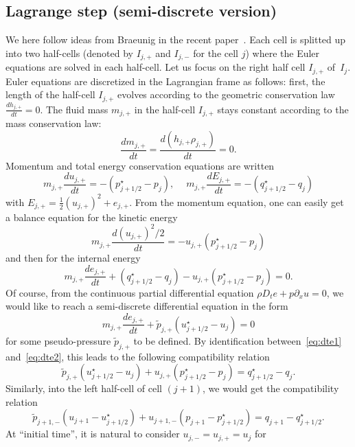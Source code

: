 \documentclass[graybox]{svmult}
\newcommand{\rhojp}{\rho_{j,+}}
\newcommand{\ujp}{u_{j,+}}
\newcommand{\pjp}{\tilde p_{j,+}}
\newcommand{\ps}{p_{j+1/2}^\star}
\newcommand{\us}{u_{j+1/2}^\star}
\newcommand{\qs}{q_{j+1/2}^\star}
\newcommand{\ejp}{e_{j,+}}
\newcommand{\Ejp}{E_{j,+}}
\newcommand{\mjp}{m_{j,+}}
\newcommand{\hjp}{h_{j,+}}
\begin{document}
\subsection{Lagrange step (semi-discrete version)}
%
We here follow ideas from Braeunig in the recent paper~\cite{JPB2016}. Each cell is splitted
up into two half-cells (denoted by $I_{j,+}$ and $I_{j,-}$ for the cell $j$) where the Euler equations are solved in each half-cell. Let us focus on the right half cell $I_{j,+}$
of~$I_j$.
Euler equations are discretized in the Lagrangian frame as follows: first,
the length of the half-cell $I_{j,+}$ evolves according to the geometric conservation law
$\frac{d\hjp}{dt} = 0$. The fluid mass $\mjp$ in the half-cell $I_{j,+}$ stays constant according to the mass conservation law: 
\[
\frac{d\mjp}{dt} = \frac{d(\hjp\rhojp)}{dt} = 0.
\]
Momentum and total energy conservation equations are written
%
\[
\mjp \frac{d\ujp}{dt} = -\left(\ps - p_j\right), \ \quad \mjp \frac{d\Ejp}{dt} = -\left(\qs - q_j\right)
\]
%
with $\Ejp = \frac{1}{2}(\ujp)^2+\ejp$. From the momentum equation, one can easily
get a balance equation for the kinetic energy
\[
\mjp \frac{d(\ujp)^2/2}{dt} = -\ujp\left(\ps - p_j\right)
\]
and then for the internal energy
%
\begin{equation}
\mjp \frac{d\ejp}{dt} + \left(\qs - q_j\right) - \ujp\left(\ps - p_j\right) = 0.
\label{eq:dte1}
\end{equation}
%
Of course, from the continuous partial differential equation $\rho D_t e + p \partial_x u = 0$, we would like
to reach a semi-discrete differential equation in the form
%
\begin{equation}
\mjp \frac{d\ejp}{dt} + \pjp \left(\us - u_j \right) = 0
\label{eq:dte2}
\end{equation}
%
for some pseudo-pressure $\pjp$ to be defined.
%
By identification between~\eqref{eq:dte1} and~\eqref{eq:dte2}, 
this leads to the following compatibility relation
%
\begin{equation}
\pjp \left(\us - u_j \right) + \ujp\left(\ps - p_j\right) = \qs - q_j.
\label{eq:c1}
\end{equation}
%
Similarly, into the left half-cell of cell $(j+1)$, we would get the compatibility
relation
%
\begin{equation}
\tilde p_{j+1,-} \left(u_{j+1}-\us\right) + u_{j+1,-}\left(p_{j+1}-\ps \right)
= q_{j+1} - \qs.
\label{eq:c2}
\end{equation}
%
At ``initial time'', it is natural to consider $u_{j,-} = u_{j,+} = u_j$ for
\end{document}
